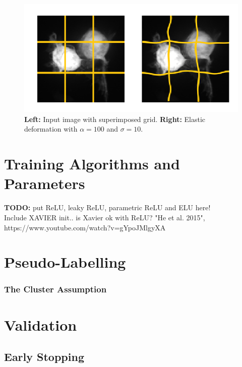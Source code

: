 \begin {figure}[!ht]
	\begin{center}
		\includegraphics[scale=0.80]{img/fig_elastic.png}
	\end{center}
	\caption[]{\textbf{Left:} Input image with superimposed grid. \textbf{Right:} Elastic deformation with $\alpha = 100$ and $\sigma = 10$.}
	\label{fig:elastic}
\end {figure}

	\section {Training Algorithms and Parameters}
	\label{act_funcs}
	\textbf{TODO:} put ReLU, leaky ReLU, parametric ReLU and ELU here!\\ Include XAVIER init.. is Xavier ok with ReLU? "He et al. 2015", https://www.youtube.com/watch?v=gYpoJMlgyXA


	\section {Pseudo-Labelling}

		\subsubsection {The Cluster Assumption}

	\section {Validation}
		
		\subsection{Early Stopping}